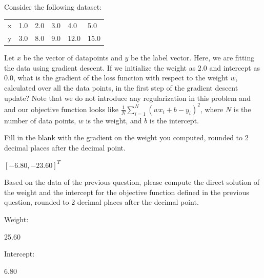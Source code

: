 \documentclass[11pt,addpoints,answers]{exam}
\numberwithin{equation}{section} %
\numberwithin{figure}{section} %
\numberwithin{table}{section} %
\begin{document}
\begin{questions}
    
    
    \newpage
    
    \question[2] \label{Q7_linear_regression} Consider the following dataset:
    \begin{table}[H]
    \centering
        \begin{tabular}{llllll}
        x & 1.0 & 2.0 & 3.0 & 4.0 & 5.0 \\
        y & 3.0 & 8.0 & 9.0 & 12.0 & 15.0
        \end{tabular}
    \end{table}
    Let $x$ be the vector of datapoints and $y$ be the label vector. Here, we are fitting the data using gradient descent. If we initialize the weight as $2.0$ and intercept as $0.0$, what is the gradient of the loss function with respect to the weight $w$, calculated over all the data points, in the first step of the gradient descent update? Note that we do not introduce any regularization in this problem and and our objective function looks like $\frac{1}{N}\sum_{i=1}^N (wx_i + b - y_i)^2$, where $N$ is the number of data points, $w$ is the weight, and $b$ is the intercept.
    
    Fill in the blank with the gradient on the weight you computed, rounded to 2 decimal places after the decimal point.
    
    \begin{tcolorbox}[fit,height=1cm, width=4cm, blank, borderline={1pt}{-2pt},nobeforeafter, top=2pt, left=2pt, right=2pt, bottom=2pt]
	    $[-6.80, -23.60]^T$
    \end{tcolorbox}
    
    
    
    \question[4] Based on the data of the previous question, please compute the direct solution of the weight and the intercept for the objective function defined in the previous question, rounded to 2 decimal places after the decimal point.
    
    Weight: \quad
    \begin{tcolorbox}[fit,height=1cm, width=4cm, blank, borderline={1pt}{-2pt},nobeforeafter, top=2pt, left=2pt, right=2pt, bottom=2pt]  25.60
    \end{tcolorbox}
    
    
    Intercept: \quad
    \begin{tcolorbox}[fit,height=1cm, width=4cm, blank, borderline={1pt}{-2pt},nobeforeafter, top=2pt, left=2pt, right=2pt, bottom=2pt] 6.80
    \end{tcolorbox}
    

\end{questions}
\end{document}
